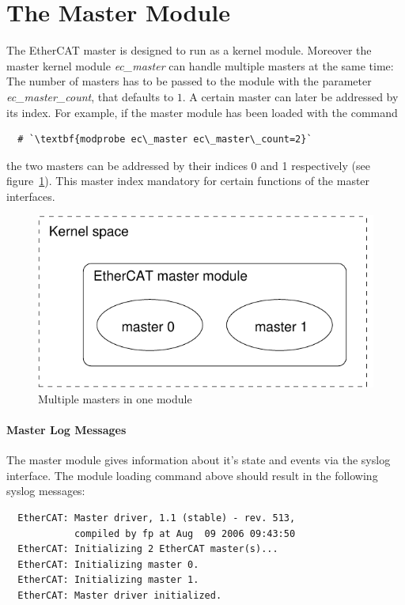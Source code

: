 \documentclass[a4paper,12pt,BCOR6mm,bibtotoc,idxtotoc]{scrbook}
\begin{document}

\section{The Master Module}
\label{sec:mastermod}

The EtherCAT master is designed to run as a kernel module. Moreover
the master kernel module \textit{ec\_master} can handle multiple
masters at the same time: The number of masters has to be passed to
the module with the parameter \textit{ec\_master\_count}, that
defaults to $1$. A certain master can later be addressed by its index.
For example, if the master module has been loaded with the command

\begin{lstlisting}
  # `\textbf{modprobe ec\_master ec\_master\_count=2}`
\end{lstlisting}

the two masters can be addressed by their indices 0 and 1 respectively
(see figure~\ref{fig:masters}). This master index mandatory for
certain functions of the master interfaces.

\begin{figure}[htbp]
  \centering
  \includegraphics[width=.5\textwidth]{images/masters}
  \caption{Multiple masters in one module}
  \label{fig:masters}
\end{figure}

\paragraph{Master Log Messages}

The master module gives information about it's state and events via
the syslog interface. The module loading command above should result
in the following syslog messages:

\begin{lstlisting}
  EtherCAT: Master driver, 1.1 (stable) - rev. 513,
            compiled by fp at Aug  09 2006 09:43:50
  EtherCAT: Initializing 2 EtherCAT master(s)...
  EtherCAT: Initializing master 0.
  EtherCAT: Initializing master 1.
  EtherCAT: Master driver initialized.
\end{lstlisting}
\end{document}
